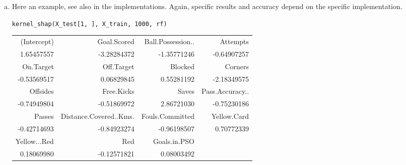 {\begin{enumerate}[a)]
	Pseudocode of \texttt{kernel\_shap()}
	
	\begin{algorithm}[H]
		\caption{\texttt{kernel\_shap()}}
		\begin{algorithmic}[1]
			\Require \texttt{obs}: observation
			\Require \texttt{X}: feature matrix
			\Require \texttt{nr\_samples}: number of samples
			\Require \texttt{predict}: prediction model
			\State \texttt{mask, pred, weight} $\gets$ \texttt{shap\_data(obs, X, nr\_samples, predict)}
			\State \texttt{lm} $\gets$ weighted linear regression model using \texttt{mask, pred} and \texttt{weight}
			\State \textbf{return} coefficients of \texttt{lm}
		\end{algorithmic}
	\end{algorithm}

	\item
    Here an example, see also in the implementations. Again, specific results and accuracy depend on the specific implementation.
    
    \texttt{kernel\_shap(X\_test[1, ], X\_train, 1000, rf)}
	\begin{table}[H]
		\centering
		\begin{tabular}{rrrr}
			\hline 
			(Intercept) &Goal.Scored & Ball.Possession..  & Attempts \\

			1.65457557 & -3.28284372& -1.35771246 &-0.64907257  \\
			\hline
			On.Target& Off.Target & Blocked &  Corners  \\

			-0.53569517& 0.06829845 & 0.55281192 & -2.18349575  \\
			\hline
			Offsides & Free.Kicks & Saves & Pass.Accuracy..  \\

			-0.74949804  & -0.51869972 & 2.86721030 & -0.75230186   \\
			\hline
			Passes & Distance.Covered..Kms. & Fouls.Committed & Yellow.Card   \\

			-0.42714693 & -0.84923274  & -0.96198507 & 0.70772339  \\
			\hline
			Yellow...Red & Red & Goals.in.PSO &   \\

			0.18069980 & -0.12571821  &  0.08003492 & \\
			\hline
		\end{tabular} 
	\end{table}	
\end{enumerate} 
}
